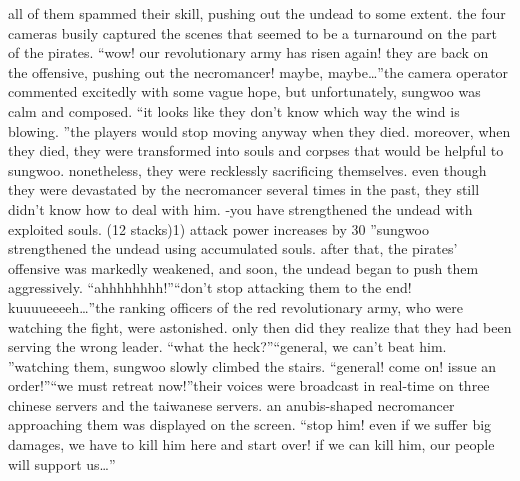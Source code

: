  all of them spammed their skill, pushing out the undead to some extent.
the four cameras busily captured the scenes that seemed to be a turnaround on the part of the pirates.
“wow! our revolutionary army has risen again! they are back on the offensive, pushing out the necromancer! maybe, maybe…”the camera operator commented excitedly with some vague hope, but unfortunately, sungwoo was calm and composed.
“it looks like they don’t know which way the wind is blowing.
”the players would stop moving anyway when they died.
 moreover, when they died, they were transformed into souls and corpses that would be helpful to sungwoo.
 nonetheless, they were recklessly sacrificing themselves.
 even though they were devastated by the necromancer several times in the past, they still didn’t know how to deal with him.
-you have strengthened the undead with exploited souls.
 (12 stacks)1) attack power increases by 30%
”sungwoo strengthened the undead using accumulated souls.
after that, the pirates’ offensive was markedly weakened, and soon, the undead began to push them aggressively.
“ahhhhhhhh!”“don’t stop attacking them to the end! kuuuueeeeh…”the ranking officers of the red revolutionary army, who were watching the fight, were astonished.
only then did they realize that they had been serving the wrong leader.
“what the heck?”“general, we can’t beat him.
”watching them, sungwoo slowly climbed the stairs.
“general! come on! issue an order!”“we must retreat now!”their voices were broadcast in real-time on three chinese servers and the taiwanese servers.
an anubis-shaped necromancer approaching them was displayed on the screen.
“stop him! even if we suffer big damages, we have to kill him here and start over! if we can kill him, our people will support us…”

